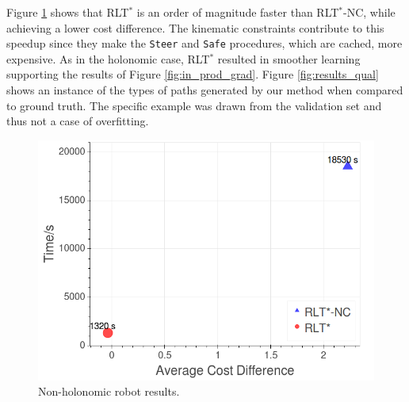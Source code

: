 \documentclass[letterpaper, 10 pt, conference]{ieeeconf}
\begin{document}
Figure \ref{fig:results_kino} shows that RLT$^*$ is an order of magnitude faster than RLT$^*$-NC, while achieving a lower cost difference. The kinematic constraints contribute to this speedup since they make the \texttt{Steer} and \texttt{Safe} procedures, which are cached, more expensive. As in the holonomic case, RLT$^*$ resulted in smoother learning supporting the results of Figure \ref{fig:in_prod_grad}. Figure \ref{fig:results_qual} shows an instance of the types of paths generated by our method when compared to ground truth. The specific example was drawn from the validation set and thus not a case of overfitting.
  	\begin{figure}[tbh]
	\centering
	\captionsetup[subfigure]{justification=centering}
	\hspace{-1cm}
    \includegraphics[scale=0.25]{images/pareto_front_kino.png}

    \caption{Non-holonomic robot results.}
    \vspace{-2mm}
  \label{fig:results_kino}
  \end{figure}
\end{document}
